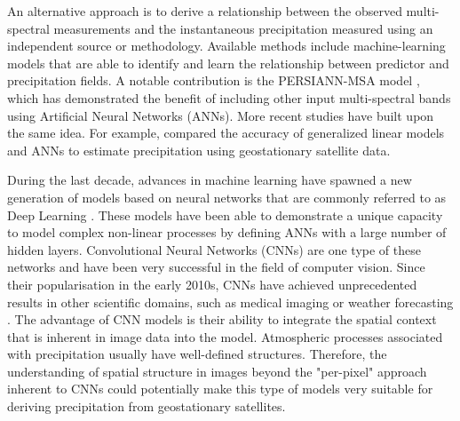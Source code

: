 \documentclass[3p,times]{elsarticle}
\begin{document}
An alternative approach is to derive a relationship between the observed multi-spectral measurements and the instantaneous precipitation measured using an independent source or methodology. Available methods include machine-learning models that are able to identify and learn the relationship between predictor and precipitation fields. A notable contribution is the PERSIANN-MSA model \citep{behrangi2009persiann}, which has demonstrated the benefit of including other input multi-spectral bands using Artificial Neural Networks (ANNs). More recent studies have built upon the same idea. For example,  \citep{beusch2018satellite} compared the accuracy of generalized linear models and ANNs to estimate precipitation using geostationary satellite data. 

During the last decade, advances in machine learning have spawned a new generation of models based on neural networks that are commonly referred to as Deep Learning \citep{lecun2015deep}. These models have been able to demonstrate a unique capacity to model complex non-linear processes by defining ANNs with a large number of hidden layers. Convolutional Neural Networks (CNNs) are one type of these networks and have been very successful in the field of computer vision. Since their popularisation in the early 2010s, CNNs have achieved unprecedented results in other scientific domains, such as medical imaging \citep{ronneberger2015u} or weather forecasting \citep{larraondo2019data,rasp2020weatherbench}. The advantage of CNN models is their ability to integrate the spatial context that is inherent in image data into the model. Atmospheric processes associated with precipitation usually have well-defined structures. Therefore, the understanding of spatial structure in images beyond the "per-pixel" approach inherent to CNNs could potentially make this type of models very suitable for deriving precipitation from geostationary satellites. 
\end{document}
